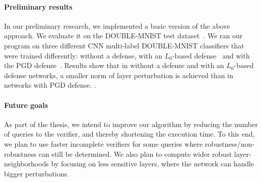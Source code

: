 \paragraph{Preliminary results}
In our preliminary research, we implemented a basic version of the above approach.
We evaluate it on the DOUBLE-MNIST test dataset~\cite{DoubleMNIST}.
We ran our program on three different CNN multi-label DOUBLE-MNIST classifiers that were trained differently: without a defense, with an $L_0$-based defense~\cite{L0} and with the PGD defense~\cite{PGD}.
Results show that in without a defense and with an $L_0$-based defense networks, a smaller norm of layer perturbation is achieved than in networks with PGD defense. .
\paragraph{Future goals}
As part of the thesis, we intend to improve our algorithm by reducing the number of queries to the verifier, and thereby shortening the execution time.
To this end, we plan to use faster incomplete verifiers for some queries where robustness/non-robustness can still be determined.
We also plan to compute wider robust layer-neighborhoods by focusing on less sensitive layers, where the network can handle bigger perturbations.

%
%
